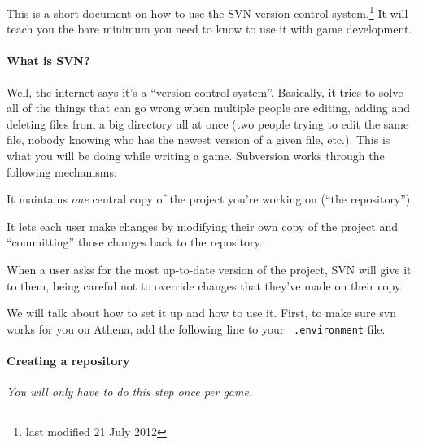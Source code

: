 \documentclass[green]{testgame}
\begin{document}
\newcommand{\ter}[1]{\fbox{\parbox{6.5in}{{\tt #1}}}}





This is a short document on how to use the SVN version control
system.\footnote{last modified 21 July 2012} It will teach you the
bare minimum you need to know to use it with game development.

\paragraph*{What is SVN?}

Well, the internet says it's a ``version control system''. Basically,
it tries to solve all of the things that can go wrong when multiple
people are editing, adding and deleting files from a big directory all
at once (two people trying to edit the same file, nobody knowing who
has the newest version of a given file, etc.). This is what you will
be doing while writing a game. Subversion works through the following
mechanisms:

\begin{itemz}[]

\item It maintains {\em one} central copy of the project you're
working on (``the repository'').

\item It lets each user make changes by modifying their own copy of
the project and ``committing'' those changes back to the repository.

\item When a user asks for the most up-to-date version of the project,
SVN will give it to them, being careful not to override changes that
they've made on their copy.

\end{itemz}

We will talk about how to set it up and how to use it. First, to make
sure svn works for you on Athena, add the following line to your {\tt
.environment} file.

\ter{add svn}

\paragraph*{Creating a repository}

{\em You will only have to do this step once per game.}
\end{document}
